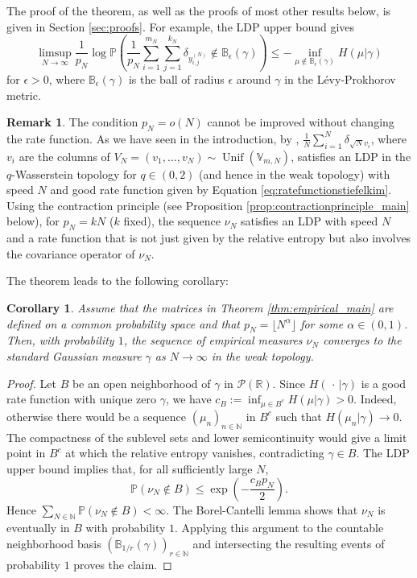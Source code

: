 \documentclass[11pt,a4paper,twoside]{article}
\renewcommand{\P}{\mathbb P}
\newcommand{\V}{\mathbb V}
\newcommand{\R}{\mathbb R}
\newcommand{\N}{\mathbb N}
\DeclareMathOperator{\Unif}{Unif}
\newtheorem{cor}[thm]{Corollary}
\theoremstyle{definition}
\newtheorem{rmk}[thm]{Remark}
\begin{document}
	  The proof of the theorem, as well as the proofs of most other results below, is given in Section \ref{sec:proofs}. For example, the LDP upper bound gives
	  $$
	  \limsup_{N\to\infty}\frac{1}{p_N}\log\P\left(\frac{1}{p_N} \sum_{i=1}^{m_N} \sum_{j=1}^{k_N} \delta_{y_{i,j}^{(N)}} \not\in \mathbb{B}_\epsilon(\gamma)\right)
	  \le -\inf_{\mu\notin \mathbb{B}_\epsilon(\gamma)}H(\mu|\gamma)
	  $$
	  for $\epsilon > 0$, where $\mathbb{B}_\epsilon(\gamma)$ is the ball of radius $\epsilon$ around $\gamma$ in the Lévy-Prokhorov metric.

	  \begin{rmk}
		The condition $p_N = o(N)$ cannot be improved without changing the rate function. As we have seen in the introduction, by \cite[Theorem 2.8]{kim2021large}, $\frac{1}{N} \sum_{i=1}^{N} \delta_{\sqrt{N} v_i}$, where $v_i$ are the columns of $V_N = (v_1, \ldots, v_N) \sim \Unif(\V_{m,N})$, satisfies an LDP in the $q$-Wasserstein topology for $q\in (0,2)$ (and hence in the weak topology) with speed $N$ and good rate function given by Equation \eqref{eq:ratefunctionstiefelkim}. Using the contraction principle (see Proposition \ref{prop:contractionprinciple_main} below), for $p_N = kN$ ($k$ fixed), the sequence $\nu_N$ satisfies an LDP with speed $N$ and a rate function that is not just given by the relative entropy but also involves the covariance operator of $\nu_N$.
	  \end{rmk}

	  \noindent The theorem leads to the following corollary:

	  \begin{cor}
		Assume that the matrices in Theorem \ref{thm:empirical_main} are defined on a common probability space and that $p_N=\lfloor N^\alpha\rfloor$ for some $\alpha \in (0,1)$. Then, with probability $1$, the sequence of empirical measures $\nu_N$ converges to the standard Gaussian measure $\gamma$ as $N\to\infty$ in the weak topology.
	  \end{cor}
	  \begin{proof}
		Let $B$ be an open neighborhood of $\gamma$ in $\mathcal{P}(\R)$. Since $H(\,\cdot\,|\gamma)$ is a good rate function with unique zero $\gamma$, we have $c_B:=\inf_{\mu\in B^c}H(\mu|\gamma)>0$. Indeed, otherwise there would be a sequence $(\mu_n)_{n\in\N}$ in $B^c$ such that $H(\mu_n|\gamma)\to0$. The compactness of the sublevel sets and lower semicontinuity would give a limit point in $B^c$ at which the relative entropy vanishes, contradicting $\gamma\in B$. The LDP upper bound implies that, for all sufficiently large $N$,
		$$
		\P(\nu_N\notin B)\le \exp\left(-\frac{c_Bp_N}{2}\right).
		$$
		Hence $\sum_{N\in\N}\P(\nu_N\notin B)<\infty$. The Borel-Cantelli lemma shows that $\nu_N$ is eventually in $B$ with probability $1$. Applying this argument to the countable neighborhood basis $(\mathbb{B}_{1/r}(\gamma))_{r\in\N}$ and intersecting the resulting events of probability $1$ proves the claim.
	  \end{proof}
\end{document}
